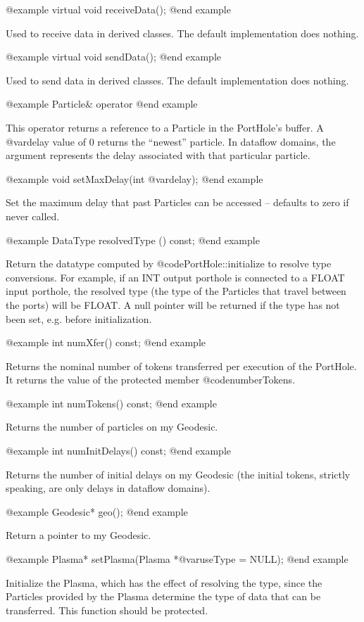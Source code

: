 @example
virtual void receiveData();
@end example

Used to receive data in derived classes.  The default implementation
does nothing.

@example
virtual void sendData();
@end example

Used to send data in derived classes.  The default implementation
does nothing.

@example
Particle& operator %
@end example

This operator returns a reference to a Particle in the PortHole's
buffer.  A @var{delay} value of 0 returns the ``newest'' particle.
In dataflow domains, the argument represents the delay associated
with that particular particle.

@example
void setMaxDelay(int @var{delay});
@end example

Set the maximum delay that past Particles can be accessed -- defaults to
zero if never called.

@example
DataType resolvedType () const;
@end example

Return the datatype computed by @code{PortHole::initialize} to resolve
type conversions.  For example, if an INT output porthole is connected
to a FLOAT input porthole, the resolved type (the type of the Particles
that travel between the ports) will be FLOAT.  A null pointer will be
returned if the type has not been set, e.g. before initialization.

@example
int numXfer() const;
@end example

Returns the nominal number of tokens transferred per execution of the
PortHole.  It returns the value of the protected member @code{numberTokens}.

@example
int numTokens() const;
@end example

Returns the number of particles on my Geodesic.

@example
int numInitDelays() const;
@end example

Returns the number of initial delays on my Geodesic (the initial tokens,
strictly speaking, are only delays in dataflow domains).

@example
Geodesic* geo();
@end example

Return a pointer to my Geodesic.

@example
Plasma* setPlasma(Plasma *@var{useType} = NULL);
@end example

Initialize the Plasma, which has the effect of resolving the type, since
the Particles provided by the Plasma determine the type of data that can
be transferred.  This function should be protected.

